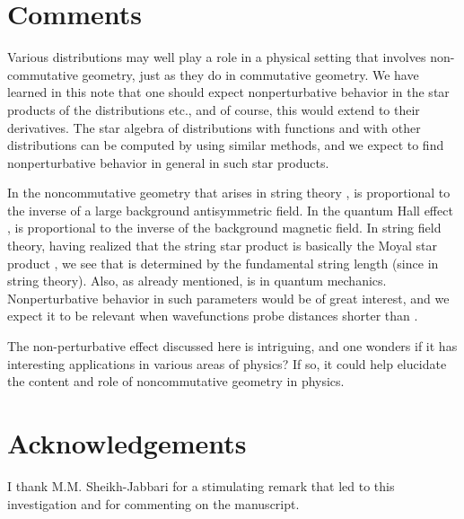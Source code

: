 \documentclass[a4paper,12pt]{article}
\begin{document}
\section{Comments}

Various distributions may well play a role in a physical setting that
involves non-commutative geometry, just as they do in commutative geometry.
We have learned in this note that one should expect nonperturbative behavior
in the star products of the distributions \coordHE{}  \coordHE{}  \coordHE{} etc., and of course,
this would extend to their derivatives. The star algebra of distributions
with functions and with other distributions can be computed by using similar
methods, and we expect to find nonperturbative behavior in general in such
star products.

In the noncommutative geometry that arises in string theory \cite{ncstring},
\myHighlight{$\theta $}\coordHE{} is proportional to the inverse of a large background antisymmetric
field. In the quantum Hall effect \cite{qhe}, \myHighlight{$\theta $}\coordHE{} is proportional to
the inverse of the background magnetic field. In string field theory, having
realized that the string star product is basically the Moyal star product
\cite{witmoy}, we see that \myHighlight{$\theta $}\coordHE{} is determined by the fundamental string
length (since \coordHE{} in string theory).
Also, as already mentioned, \myHighlight{$\theta $}\coordHE{} is \myHighlight{$\hbar $}\coordHE{} in quantum mechanics.
Nonperturbative behavior in such parameters would be of great interest, and
we expect it to be relevant when wavefunctions probe distances shorter than \myHighlight{$%
\sqrt{\theta }$}\coordHE{}.

The non-perturbative effect discussed here is intriguing, and one wonders if
it has interesting applications in various areas of physics? If so, it could
help elucidate the content and role of noncommutative geometry in physics.

\section{Acknowledgements}

I thank M.M. Sheikh-Jabbari for a stimulating remark that led to this
investigation and for commenting on the manuscript.
\end{document}
